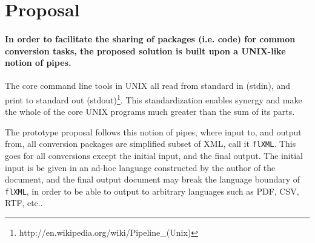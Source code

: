 \documentclass{scrreprt}
\begin{document}
%
%
%
%













%
%

\color{black}
\section{Proposal}

\paragraph{In order to facilitate the sharing of packages (i.e. code) for common conversion tasks, the proposed solution is built upon a UNIX-like notion of pipes.}  The core command line tools in UNIX all read from standard in (stdin), and print to standard out (stdout)\footnote{ http://en.wikipedia.org/wiki/Pipeline\_(Unix)}. This standardization enables synergy and make the whole of the core UNIX programs much greater than the sum of its parts.

The prototype proposal follows this notion of pipes, where input to, and output from, all conversion packages are simplified subset of XML, call it \texttt{flXML}. This goes for all conversions except the initial input, and the final output. The initial input is be given in an ad-hoc language constructed by the author of the document, and the final output document may break the language boundary of \texttt{flXML}, in order to be able to output to arbitrary languages such as PDF, CSV, RTF, etc..
\end{document}
